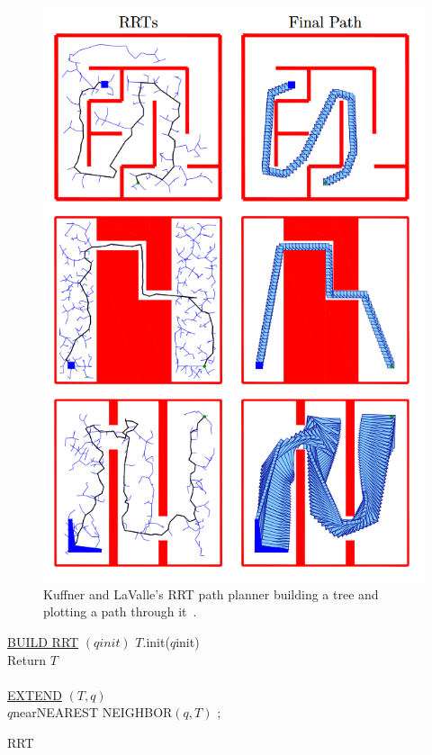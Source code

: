 \documentclass[journal]{IEEEtran}
\begin{document}
\begin{figure}[h]
	\includegraphics[width=1.0\linewidth]{KuffnerRRT.png}
	\caption{ Kuffner and LaValle's RRT path planner building a tree and plotting a path through it~\cite{Kuffner2000}.}
	\label{KuffnerRRT}
\end{figure} 

\begin{algorithm}
	\underline{BUILD RRT} $(qinit)$\;
	$T$.init($q$init)\;
	\\
	Return $T$ 
	\\\hrulefill
	\\  
	\underline{EXTEND} $(T,q)$ \\

	$q$near\gets NEAREST NEIGHBOR$(q,T)$ ;\ \\

	\caption{RRT}
\end{algorithm}
\end{document}
